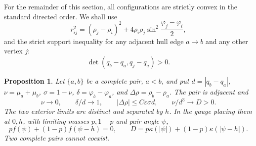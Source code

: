 \documentclass[11pt,a4paper]{article}
\numberwithin{equation}{section}
\newtheorem{proposition}[theorem]{Proposition}
\theoremstyle{remark}
\newcommand{\eps}{\varepsilon}
\begin{document}
For the remainder of this section, all configurations are strictly convex in the standard directed order. We shall use
\begin{equation}\label{eq:distance}
 r_{ij}^2=(\rho_j-\rho_i)^2+4\rho_i\rho_j\sin^2\frac{\varphi_j-\varphi_i}{2},
\end{equation}
and the strict support inequality for any adjacent hull edge $a\to b$ and any other vertex $j$:
\begin{equation}\label{eq:support}
 \det(q_b-q_a,q_j-q_a)>0.
\end{equation}

\begin{proposition}\label{prop:pair-scale}
Let $\{a,b\}$ be a complete pair, $a<b$, and put $d=|q_b-q_a|$, $\nu=\mu_a+\mu_b$, $\sigma=1-\nu$, $\delta=\varphi_b-\varphi_a$, and $\Delta\rho=\rho_b-\rho_a$. The pair is adjacent and
\begin{equation}\label{eq:pair-scale}
 \nu\to0,\qquad \delta/d\to1,\qquad |\Delta\rho|\le C\eps\sigma d,
 \qquad \nu/d^3\to D>0.
\end{equation}
The two exterior limits are distinct and separated by $h$. In the gauge placing them at $0,h$, with limiting masses $p,1-p$ and pair angle $\psi$,
\[
 pf(\psi)+(1-p)f(\psi-h)=0,\qquad
 D=p\kappa(|\psi|)+(1-p)\kappa(|\psi-h|).
\]
Two complete pairs cannot coexist.
\end{proposition}
\end{document}
